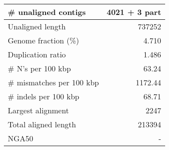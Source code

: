 \documentclass[12pt,a4paper]{article}
\begin{document}
\begin{table}[ht]
\begin{center}
\begin{tabular}{|l*{1}{|r}|}
\# unaligned contigs & 4021 + 3 part \\ \hline
Unaligned length & 737252 \\ \hline
Genome fraction (\%) & 4.710 \\ \hline
Duplication ratio & 1.486 \\ \hline
\# N's per 100 kbp & 63.24 \\ \hline
\# mismatches per 100 kbp & 1172.44 \\ \hline
\# indels per 100 kbp & 68.71 \\ \hline
Largest alignment & 2247 \\ \hline
Total aligned length & 213394 \\ \hline
NGA50 & - \\ \hline
\end{tabular}
\end{center}
\end{table}
\end{document}
